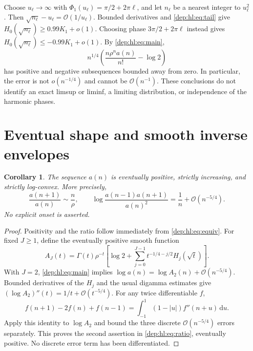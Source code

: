 \documentclass[11pt]{article}
\newtheorem{corollary}[theorem]{Corollary}
\theoremstyle{definition}\newtheorem{definition}[theorem]{Definition}
\theoremstyle{remark}\newtheorem{remark}[theorem]{Remark}
\newcommand{\OO}{\mathcal O}
\newcommand{\dd}{\,\mathrm d}
\begin{document}
Choose $u_\ell\to\infty$ with
$\Phi_1(u_\ell)=\pi/2+2\pi\ell$, and let $n_\ell$ be a nearest
integer to $u_\ell^2$. Then
$\sqrt{n_\ell}-u_\ell=\OO(1/u_\ell)$. Bounded derivatives and
\eqref{dep:hl:eq:tail} give
$H_0(\sqrt{n_\ell})\ge0.99K_1+o(1)$.
Choosing phase $3\pi/2+2\pi\ell$ instead gives
$H_0(\sqrt{n_\ell})\le-0.99K_1+o(1)$. By \eqref{dep:hl:eq:main},
\[
 n^{1/4}\left(\frac{n\rho^na(n)}{n!}-\log 2\right)
\]
has positive and negative subsequences bounded away from zero. In
particular, the error is not $o(n^{-1/4})$ and cannot be
$\OO(n^{-1})$. These conclusions do not identify an exact limsup or
liminf, a limiting distribution, or independence of the harmonic
phases.

\section{Eventual shape and smooth inverse envelopes}\label{dep:hl:sec:inverse}
\begin{corollary}\label{dep:hl:cor:shape}
The sequence $a(n)$ is eventually positive, strictly increasing, and
strictly log-convex. More precisely,
\begin{equation}\label{dep:hl:eq:ratio}
 \frac{a(n+1)}{a(n)}\sim\frac n\rho,\qquad
 \log\frac{a(n-1)a(n+1)}{a(n)^2}=\frac1n+\OO(n^{-5/4}).
\end{equation}
No explicit onset is asserted.
\end{corollary}
\begin{proof}
Positivity and the ratio follow immediately from \eqref{dep:hl:eq:equiv}.
For fixed $J\ge1$, define the eventually positive smooth function
\begin{equation}\label{dep:hl:eq:AJ}
 A_J(t)=\Gamma(t)\rho^{-t}
  \left[\log 2+\sum_{j=0}^{J-1}t^{-1/4-j/2}H_j(\sqrt t)\right].
\end{equation}
With $J=2$, \eqref{dep:hl:eq:main} implies
$\log a(n)=\log A_2(n)+\OO(n^{-5/4})$.
Bounded derivatives of the $H_j$ and the usual digamma estimates give
$(\log A_2)''(t)=1/t+\OO(t^{-5/4})$.
For any twice differentiable $f$,
\[
 f(n+1)-2f(n)+f(n-1)=\int_{-1}^1(1-|u|)f''(n+u)\dd u.
\]
Apply this identity to $\log A_2$ and bound the three discrete
$\OO(n^{-5/4})$ errors separately. This proves the second assertion in
\eqref{dep:hl:eq:ratio}, eventually positive. No discrete error term has
been differentiated.
\end{proof}
\end{document}
